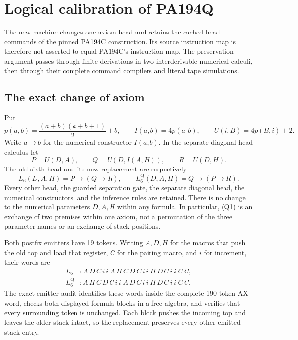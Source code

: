 \section{Logical calibration of PA194Q}
\label{sec:q-calibration}

The new machine changes one axiom head and retains the cached-head
commands of the pinned PA194C construction. Its source instruction map
is therefore not asserted to equal PA194C's instruction map. The
preservation argument passes through finite derivations in two
interderivable numerical calculi, then through their complete command
compilers and literal tape simulations.

\subsection{The exact change of axiom}

Put
\[
 p(a,b)=\frac{(a+b)(a+b+1)}2+b,\qquad
 I(a,b)=4p(a,b),\qquad U(i,B)=4p(B,i)+2.
\]
Write $a\to b$ for the numerical constructor $I(a,b)$. In the
separate-diagonal-head calculus let
\[
 P=U(D,A),\qquad Q=U(D,I(A,H)),\qquad R=U(D,H).
\]
The old sixth head and its new replacement are respectively
\[
 L_6(D,A,H)=P\to(Q\to R),\qquad
 L_6^{\mathrm Q}(D,A,H)=Q\to(P\to R).
\tag{Q1}
\]
Every other head, the guarded separation gate, the separate diagonal
head, the numerical constructors, and the inference rules are retained.
There is no change to the numerical parameters $D,A,H$ within any
formula. In particular, (Q1) is an exchange of two premises within one
axiom, not a permutation of the three parameter names or an exchange
of stack positions.

Both postfix emitters have 19 tokens. Writing $A,D,H$ for the macros
that push the old top and load that register, $C$ for the pairing macro,
and $i$ for increment, their words are
\[
\begin{aligned}
 L_6 &: A\,D\,C\,i\,i\;
         A\,H\,C\,D\,C\,i\,i\;
         H\,D\,C\,i\,i\;C\,C,\\
 L_6^{\mathrm Q} &: A\,H\,C\,D\,C\,i\,i\;
         A\,D\,C\,i\,i\;
         H\,D\,C\,i\,i\;C\,C.
\end{aligned}
\tag{Q2}
\]
The exact emitter audit identifies these words inside the complete
190-token AX word, checks both displayed formula blocks in a free algebra,
and verifies that every surrounding token is unchanged. Each block pushes
the incoming top and leaves the older stack intact, so the replacement
preserves every other emitted stack entry.

